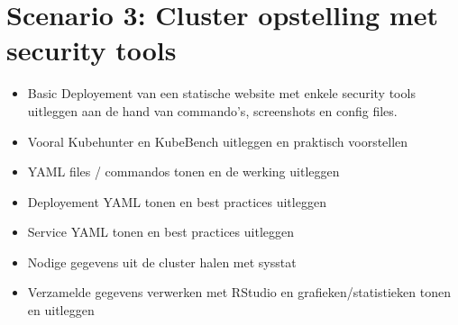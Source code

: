 \clearpage
\section{Scenario 3: Cluster opstelling met security tools}
\begin{itemize}
	\item Basic Deployement van een statische website met enkele security tools uitleggen aan de hand van commando's, screenshots en config files. 
	\item Vooral Kubehunter en KubeBench uitleggen en praktisch voorstellen
	\item YAML files / commandos tonen en de werking uitleggen
	\item Deployement YAML tonen en best practices uitleggen
	\item Service YAML tonen en best practices uitleggen
	\item Nodige gegevens uit de cluster halen met sysstat
	\item Verzamelde gegevens verwerken met RStudio en grafieken/statistieken tonen en uitleggen
\end{itemize}
